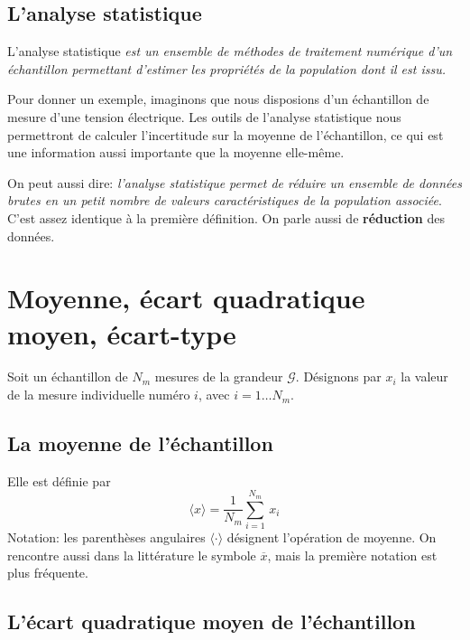 \subsection{L'analyse statistique}

L'analyse statistique \textit{est un ensemble de méthodes de traitement numérique d'un échantillon permettant d'estimer les propriétés de la population dont il est issu.}

Pour donner un exemple, imaginons que nous disposions d'un échantillon de mesure d'une tension électrique. Les outils de l'analyse statistique nous permettront de calculer l'incertitude sur la moyenne de l'échantillon, ce qui est une information aussi importante que la moyenne elle-même.

On peut aussi dire: \textit{l'analyse statistique permet de réduire un ensemble de données brutes en un petit nombre de valeurs caractéristiques de la population associée}. C'est assez identique à la première définition. On parle aussi de \textbf{réduction} des données.

\section{Moyenne, écart quadratique moyen, écart-type}

Soit un échantillon de $N_m$ mesures de la grandeur $\mathcal{G}$. Désignons par $x_i$ la valeur de la mesure individuelle numéro $i$, avec $i=1\dots N_m$.

\subsection{La moyenne de l'échantillon}

Elle est définie par
\begin{equation}
    \langle x\rangle=\frac{1}{N_m}\sum\limits_{i=1}^{N_m}\,x_i
\end{equation}
Notation: les parenthèses angulaires $\langle\cdot\rangle$ désignent l'opération de moyenne. On rencontre aussi dans la littérature le symbole $\overline{x}$, mais la première notation est plus fréquente.

\subsection{L'écart quadratique moyen de l'échantillon}


